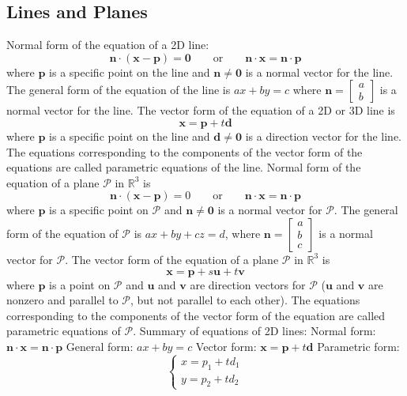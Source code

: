 \documentclass{article}
\begin{document}
        \subsection{Lines and Planes}
        \begin{outline}
            \1 Normal form of the equation of a 2D line: \[\mathbf{n\cdot(x-p)=0}\qquad\text{or}\qquad\mathbf{n\cdot x=n\cdot p}\] where \(\mathbf p\) is a specific point on the line and \(\mathbf{n\neq 0}\) is a normal vector for the line. 
            \1 The general form of the equation of the line is \(ax+by=c\) where \(\mathbf n=\begin{bmatrix}a\\b\end{bmatrix}\) is a normal vector for the line. 
            \1 The vector form of the equation of a 2D or 3D line is \[\mathbf{x=p}+t\mathbf{d}\] where \(\mathbf p\) is a specific point on the line and \(\mathbf{d\neq 0}\) is a direction vector for the line. The equations corresponding to the components of the vector form of the equations are called parametric equations of the line. 
            \1 Normal form of the equation of a plane \(\mathscr{P}\) in \(\mathbb R^3\) is \[\mathbf{n\cdot(x-p)}=0\qquad\text{or}\qquad\mathbf{n\cdot x=n\cdot p}\] where \(\mathbf p\) is a specific point on \(\mathscr P\) and \(\mathbf{n\neq 0}\) is a normal vector for \(\mathscr P\). 
            \1 The general form of the equation of \(\mathscr P\) is \(ax+by+cz=d\), where \(\mathbf n=\begin{bmatrix}a\\b\\c\end{bmatrix}\) is a normal vector for \(\mathscr P\). 
            \1 The vector form of the equation of a plane \(\mathscr P\) in \(\mathbb R^3\) is \[\mathbf{x=p}+s\mathbf u+t\mathbf v\] where \(\mathbf p\) is a point on \(\mathscr P\) and \(\mathbf u\) and \(\mathbf v\) are direction vectors for \(\mathscr P\) (\(\mathbf u\) and \(\mathbf v\) are nonzero and parallel to \(\mathscr P\), but not parallel to each other). The equations corresponding to the components of the vector form of the equation are called parametric equations of \(\mathscr P\). 
            \1 Summary of equations of 2D lines:
                \2 Normal form: \(\mathbf{n\cdot x=n\cdot p}\)
                \2 General form: \(ax+by=c\)
                \2 Vector form: \(\mathbf{x=p}+t\mathbf{d}\)
                \2 Parametric form: \[\begin{cases}x=p_1+td_1\\y=p_2+td_2\end{cases}\]

\end{outline}
\end{document}

